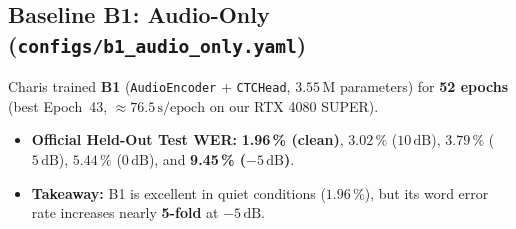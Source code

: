 \documentclass[11pt,a4paper]{article}
\newcommand{\code}[1]{\texttt{\small #1}}
\begin{document}
\subsection{Baseline B1: Audio-Only (\code{configs/b1\_audio\_only.yaml})}
Charis trained \textbf{B1} (\code{AudioEncoder} + \code{CTCHead}, $3.55\,\text{M}$ parameters) for \textbf{52 epochs} (best Epoch~43, $\approx 76.5\,\text{s/epoch}$ on our RTX 4080 SUPER).
\begin{itemize}
  \item \textbf{Official Held-Out Test WER:} \textbf{1.96\,\% (clean)}, $3.02\,\%$ ($10\,\text{dB}$), $3.79\,\%$ ($5\,\text{dB}$), $5.44\,\%$ ($0\,\text{dB}$), and \textbf{9.45\,\% ($-5\,\text{dB}$)}.
  \item \textbf{Takeaway:} B1 is excellent in quiet conditions ($1.96\,\%$), but its word error rate increases nearly \textbf{5-fold} at $-5\,\text{dB}$.
\end{itemize}
\end{document}
